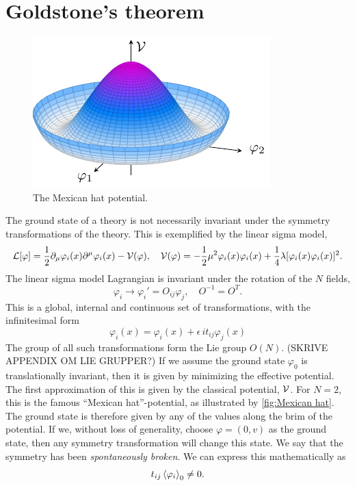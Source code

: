 \section{Goldstone's theorem}

\begin{figure}[ht]
    \centering
    \includegraphics[]{figurer/mexican_hat.pdf}
    \caption{The Mexican hat potential.}
    \label{fig:Mexican hat}
\end{figure}


The ground state of a theory is not necessarily invariant under the symmetry transformations of the theory.
This is exemplified by the linear sigma model,
\begin{equation}
    \mathcal{L}[\varphi] 
    = \frac{1}{2} \partial_\mu \varphi_i(x) \partial^\mu \varphi_i(x) - \mathcal{V}(\varphi),
    \quad \mathcal{V}(\varphi) = - \frac{1}{2} \mu^2 \varphi_i(x)\varphi_i(x)
    + \frac{1}{4} \lambda [\varphi_i(x) \varphi_i(x)]^2.
\end{equation}
The linear sigma model Lagrangian is invariant under the rotation of the $N$ fields,
\begin{equation}
    \varphi_i \longrightarrow \varphi_i' = O_{ij} \varphi_j,
    \quad O^{-1} = O^{T}.
\end{equation}
This is a global, internal and continuous set of transformations, with the infinitesimal form
\begin{equation}
    \varphi_i(x) = \varphi_i(x) + \epsilon \, i t_{ij} \varphi_j(x)
\end{equation}
The group of all such transformations form the Lie group $O(N)$. (SKRIVE APPENDIX OM LIE GRUPPER?)
If we assume the ground state $\varphi_{0}$ is translationally invariant, then it is given by minimizing the effective potential.
The first approximation of this is given by the classical potential, $\mathcal{V}$.
For $N=2$, this is the famous ``Mexican hat''-potential, as illustrated by \autoref{fig:Mexican hat}.
The ground state is therefore given by any of the values along the brim of the potential.
If we, without loss of generality, choose $\varphi = (0, v)$ as the ground state, then any symmetry transformation will change this state.
We say that the symmetry has been \emph{spontaneously broken}.
We can express this mathematically as
\begin{equation}
    t_{ij} \ex{ \varphi_i}_0 \neq 0.
\end{equation}


